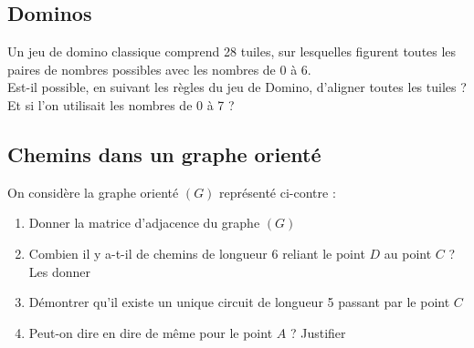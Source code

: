 \documentclass[oneside,12pt]{book}          %
\begin{document}
\subsection{Dominos}
Un jeu de domino classique comprend 28 tuiles, sur lesquelles figurent toutes les paires de nombres possibles avec les nombres de 0 à 6.\\
Est-il possible, en suivant les règles du jeu de Domino, d'aligner toutes les tuiles ?\\
Et si l'on utilisait les nombres de 0 à 7 ?



\subsection{Chemins dans un graphe orienté}
On considère la graphe orienté $(G)$ représenté ci-contre : \\

\begin{minipage}{0.6\linewidth}
    \begin{enumerate}
        \item Donner la matrice d'adjacence du graphe $(G)$
        \item Combien il y a-t-il de chemins de longueur 6 reliant le point $D$ au point $C$ ? Les donner
        \item Démontrer qu'il existe un unique circuit de longueur 5 passant par le point $C$
        \item Peut-on dire en dire de même pour le point $A$ ? Justifier
    \end{enumerate}
\end{minipage}
\hfill
\begin{minipage}{0.3\linewidth}
\end{minipage}
\end{document}
